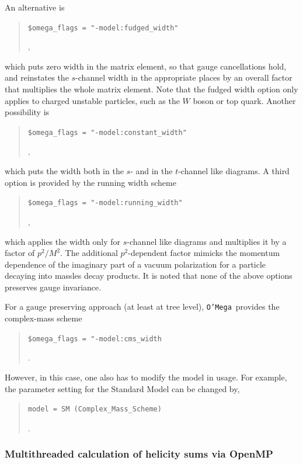 \documentclass[12pt]{book}
\newcommand{\ttt}[1]{\texttt{#1}}
\newcommand{\oMega}{\ttt{O'Mega}}
\begin{document}
An alternative is
\begin{quote}
\begin{footnotesize}
  \verb|$omega_flags = "-model:fudged_width"|
\end{footnotesize},
\end{quote}
which puts zero width in the matrix element, so that gauge cancellations
hold, and reinstates the $s$-channel width in the appropriate places by an
overall factor that multiplies the whole matrix element.
Note that the fudged width option only applies to charged unstable particles, such as the $W$ boson or top quark.
Another possibility is
\begin{quote}
\begin{footnotesize}
  \verb|$omega_flags = "-model:constant_width"|
\end{footnotesize},
\end{quote}
which puts the width both in the $s$- and in the $t$-channel like diagrams.
A third option is provided by the running width scheme
\begin{quote}
  \begin{footnotesize}
   \verb|$omega_flags = "-model:running_width"|
  \end{footnotesize},
\end{quote}
which applies the width only for $s$-channel like diagrams and multiplies it by a factor of $p^2 / M^2$.
The additional $p^2$-dependent factor mimicks the momentum dependence of the imaginary part of a vacuum polarization for a particle decaying into massles decay products.
It is noted that none of the above options preserves gauge invariance.

For a gauge preserving approach (at least at tree level), \oMega\ provides the complex-mass scheme
\begin{quote}
  \begin{footnotesize}
    \verb|$omega_flags = "-model:cms_width|
  \end{footnotesize}.
\end{quote}
However, in this case, one also has to modify the model in usage.
For example, the parameter setting for the Standard Model can be changed by,
\begin{quote}
  \begin{footnotesize}
    \verb|model = SM (Complex_Mass_Scheme)|
  \end{footnotesize}.
\end{quote}

\subsubsection{Multithreaded calculation of helicity sums via OpenMP}
\label{sec:openmp}
\end{document}
